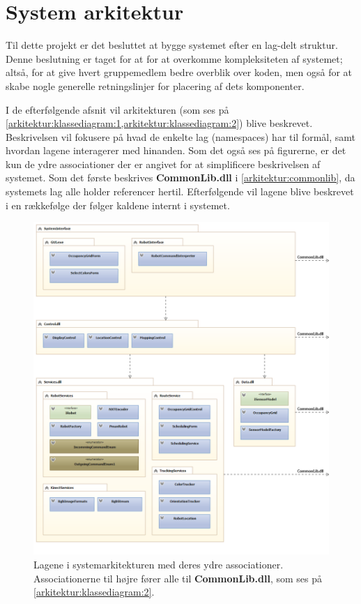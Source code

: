 \section{System arkitektur}\label{arkitektur}
Til dette projekt er det besluttet at bygge systemet efter en lag-delt struktur.
Denne beslutning er taget for at for at overkomme kompleksiteten af systemet; altså, for at give hvert gruppemedlem bedre overblik over koden, men også for at skabe nogle generelle retningslinjer for placering af dets komponenter.

I de efterfølgende afsnit vil arkitekturen (som ses på  \cref{arkitektur:klassediagram:1,arkitektur:klassediagram:2}) blive beskrevet.
Beskrivelsen vil fokusere på hvad de enkelte lag (namespaces) har til formål, samt hvordan lagene interagerer med hinanden.
Som det også ses på figurerne, er det kun de ydre associationer der er angivet for at simplificere beskrivelsen af systemet.
Som det første beskrives \textbf{CommonLib.dll} i \cref{arkitektur:commonlib}, da systemets lag alle holder referencer hertil.
Efterfølgende vil lagene blive beskrevet i en rækkefølge der følger kaldene internt i systemet.
\begin{figure}
\centering
\includegraphics[width=1\textwidth]{./graphics/systemarkitektur_1}
\caption{Lagene i systemarkitekturen med deres ydre associationer. Associationerne til højre fører alle til \textbf{CommonLib.dll}, som ses på \cref{arkitektur:klassediagram:2}.}
\label{arkitektur:klassediagram:1}
\end{figure}

